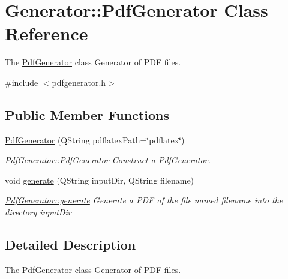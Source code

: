 \hypertarget{classGenerator_1_1PdfGenerator}{\section{Generator\-:\-:Pdf\-Generator Class Reference}
\label{classGenerator_1_1PdfGenerator}
}


The \hyperlink{classGenerator_1_1PdfGenerator}{Pdf\-Generator} class Generator of P\-D\-F files.  




{\ttfamily \#include $<$pdfgenerator.\-h$>$}

\subsection*{Public Member Functions}
\begin{DoxyCompactItemize}
\item 
\hyperlink{classGenerator_1_1PdfGenerator_a59ca8292d423302478f7f278034f7006}{Pdf\-Generator} (Q\-String pdflatex\-Path=\char`\"{}pdflatex\char`\"{})
\begin{DoxyCompactList}\small\item\em \hyperlink{classGenerator_1_1PdfGenerator_a59ca8292d423302478f7f278034f7006}{Pdf\-Generator\-::\-Pdf\-Generator} Construct a \hyperlink{classGenerator_1_1PdfGenerator}{Pdf\-Generator}. \end{DoxyCompactList}\item 
void \hyperlink{classGenerator_1_1PdfGenerator_a2fcb924e15c201474e0071f81541b0ae}{generate} (Q\-String input\-Dir, Q\-String filename)
\begin{DoxyCompactList}\small\item\em \hyperlink{classGenerator_1_1PdfGenerator_a2fcb924e15c201474e0071f81541b0ae}{Pdf\-Generator\-::generate} Generate a P\-D\-F of the file named {\itshape filename} into the directory {\itshape input\-Dir} \end{DoxyCompactList}\end{DoxyCompactItemize}


\subsection{Detailed Description}
The \hyperlink{classGenerator_1_1PdfGenerator}{Pdf\-Generator} class Generator of P\-D\-F files. 


